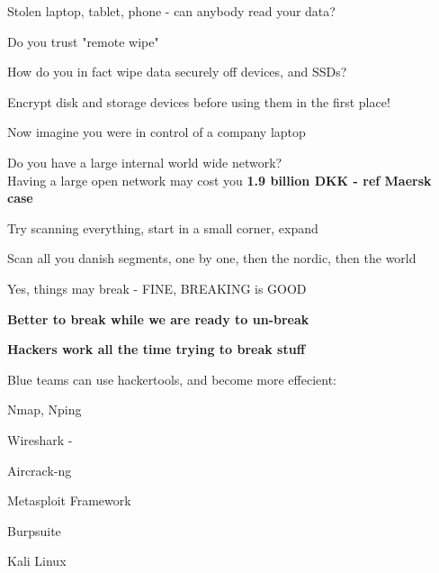 \documentclass[Screen16to9,17pt]{foils}
\begin{document}


\begin{list1}
\item Stolen laptop, tablet, phone - can anybody read your data?
\item Do you trust "remote wipe"
\item How do you in fact wipe data securely off devices, and SSDs?
\item Encrypt disk and storage devices before using them in the first place!
\end{list1}






\begin{list2}
\item Now imagine you were in control of a company laptop
\item Do you have a large internal world wide network?\\
Having a large open network may cost you {\bf 1.9 billion DKK - ref Maersk case}
\item Try scanning everything, start in a small corner, expand
\item Scan all you danish segments, one by one, then the nordic, then the world
\item Yes, things may break - FINE, BREAKING is GOOD
\end{list2}

\centerline{\bf Better to break while we are ready to un-break}






{\Large\bf Hackers work all the time trying to break stuff}

Blue teams can use hackertools, and become more effecient:
\begin{list2}
\item Nmap, Nping 
\item Wireshark - 
\item Aircrack-ng 
\item Metasploit Framework 
\item Burpsuite 
\item Kali Linux 
\end{list2}
\end{document}
